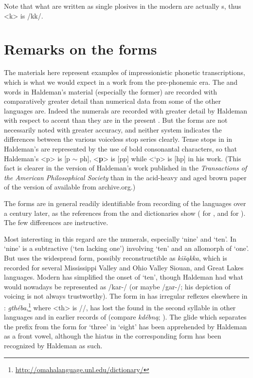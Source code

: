 \documentclass[output=paper]{LSP/langsci}
\begin{document}
Note that what are written as single plosives in the modern   are actually s, thus <k> is /kk/.  

\section{Remarks on the forms}
The materials here represent examples of impressionistic phonetic transcriptions, which is what we would expect in a work from the pre-phonemic era.  The  and  words in Haldeman's material (especially the former) are recorded with comparatively greater detail than numerical data from some of the other languages are.  Indeed the  numerals are recorded with greater detail by Haldeman with respect to accent than they are in the present .  But the forms are not necessarily noted with greater accuracy, and neither system indicates the differences between the various voiceless stop series clearly.   Tense stops in  in Haldeman's  are represented by the use of bold consonantal characters, so that  Haldeman's <p> is [p $\sim$ ph], <\textbf{p}> is [pp] while <`p> is [hp] in his  work. (This fact is clearer in the version of Haldeman's work published in the \textit{Transactions of the American Philosophical Society} than in the acid-heavy and aged brown paper of the version of \citealt{Haldeman1860} available from archive.org.)  

The forms are in general readily identifiable from recording of the languages over a century later, as the references from the  and  dictionaries show (\citealt{CumberlandRankin2012} for , and \citealt{Quintero2009} for ). The few differences are instructive.    

Most interesting in this regard are the numerals, especially `nine' and `ten'.  In  `nine' is a subtractive  (`ten lacking one') involving `ten' and an allomorph of `one'.  But   uses the widespread form, possibly reconstructible as \textit{ki\v{s}\k{a}kka}, which is recorded for several Mississippi Valley and Ohio Valley Siouan,  and Great Lakes  languages.   Modern  has simplified the onset of `ten', though Haldeman had what would nowadays be represented as /kar-/ (or maybe /gar-/; his depiction of voicing is not always trustworthy).  The form in  has irregular reflexes elsewhere in :    \textit{gthéba},\footnote{\url{http://omahalanguage.unl.edu/dictionary/}} where <th> is //, has lost the  found in the second syllable in other  languages and in earlier records of  (compare  \textit{kdébn\k{a}}; \citealt[3]{Rankin1982}). The glide which separates the prefix from the form for `three' in  `eight' has been apprehended by Haldeman as a front vowel, although the hiatus in the corresponding  form has been recognized by Haldeman as such.  
\end{document}
